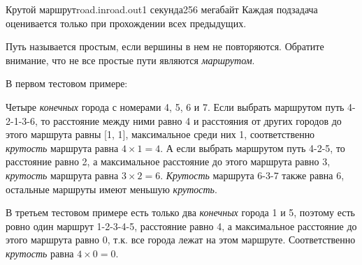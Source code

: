 \begin{problem}{Крутой маршрут}{road.in}{road.out}{1 секунда}{256 мегабайт}
Каждая подзадача оценивается только при прохождении всех предыдущих.

\Examples

\begin{example}
%
%
%
\end{example}

\Note
Путь называется простым, если вершины в нем не повторяются. Обратите внимание, что не все простые пути являются \textit{маршрутом}.

В первом тестовом примере:

Четыре \textit{конечных} города с номерами 4, 5, 6 и 7. Если выбрать маршрутом путь 4-2-1-3-6, то расстояние между ними равно 4 и расстояния от других городов до этого маршрута равны [1, 1], максимальное среди них 1, соответственно \textit{крутость} маршрута равна $4 \times 1 = 4$. А если выбрать маршрутом путь 4-2-5, то расстояние равно 2, а максимальное расстояние до этого маршрута равно 3, \textit{крутость} маршрута равна $3 \times 2 = 6$. \textit{Крутость} маршрута 6-3-7 также равна 6, остальные маршруты имеют меньшую \textit{крутость}.

В третьем тестовом примере есть только два \textit{конечных} города 1 и 5, поэтому есть ровно один маршрут 1-2-3-4-5, расстояние равно 4, а максимальное расстояние до этого маршрута равно 0, т.к. все города лежат на этом маршруте. Соответственно \textit{крутость} равна $4 \times 0 = 0$.

\end{problem}

